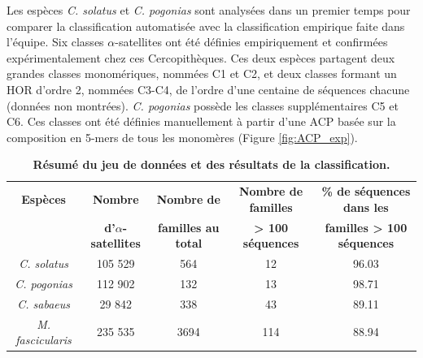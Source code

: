 \documentclass[12pt,a4paper]{article}
\begin{document}
	Les espèces \textit{C. solatus} et \textit{C. pogonias} sont analysées dans un premier temps pour comparer la classification automatisée avec la classification empirique faite dans l'équipe. Six classes $\alpha$-satellites ont été définies empiriquement et confirmées expérimentalement chez ces Cercopithèques. Ces deux espèces partagent deux grandes classes monomériques, nommées C1 et C2, et deux classes formant un HOR d'ordre 2, nommées C3-C4, de l'ordre d'une centaine de séquences chacune (données non montrées). \textit{C. pogonias} possède les classes supplémentaires C5 et C6. Ces classes ont été définies manuellement à partir d'une ACP basée sur la composition en 5-mers de tous les monomères (Figure \ref{fig:ACP_exp}). 
	
		\begin{table}
			\caption{\textbf{Résumé du jeu de données et des résultats de la classification.}}
			\center
			\begin{tabular}{|c|c|c|c|c|}
   			\hline
  			\textbf{Espèces} & \textbf{Nombre } & \textbf{Nombre de } & \textbf{Nombre de familles} & \textbf{\%  de séquences dans les}\\
  			 & \textbf{d'$\alpha$-satellites } & \textbf{familles au total} & \textbf{ > 100 séquences} & \textbf{familles > 100 séquences}\\
  		    \hline
   			\textit{C. solatus} & 105 529 & 564 & 12 & 96.03  \\
   			\hline
    		\textit{C. pogonias} & 112 902 & 132 & 13 & 98.71\\
   			\hline
   			\textit{C. sabaeus} & 29 842 & 338 & 43 & 89.11\\
   			\hline
   			\textit{M. fascicularis} & 235 535 & 3694 & 114 & 88.94\\
   			\hline			
			\end{tabular}			
			\label{tab_res}
		\end{table}		
		
\end{document}
